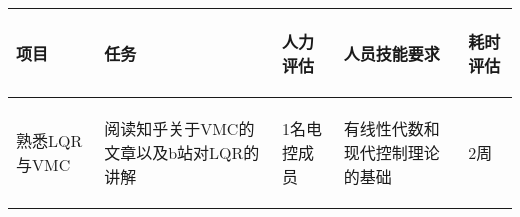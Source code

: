 
\begin{longtable}{ p{2cm} | p{3cm} | p{3cm} | p{4.8cm} | p{2cm} |}

    \hline

    \endfoot
    
    \rowcolor{tabhdcolor}

        \begin{center}
            项目
        \end{center}  &
        \begin{center}
            任务
        \end{center}  &
        \begin{center}
           人力评估
        \end{center} &
        \begin{center}
            人员技能要求
        \end{center}  &
        \begin{center}
            耗时评估
        \end{center}  \\ 
        
    \hline

    \endhead

        \begin{center}
            熟悉LQR与VMC
        \end{center} &
        \begin{center}
            阅读知乎关于VMC的文章以及b站对LQR的讲解
        \end{center} &
        \begin{center}
            1名电控成员
        \end{center} &
        \begin{center}
            有线性代数和现代控制理论的基础
        \end{center} &
        \begin{center}
            2周
        \end{center}\\
        

\end{longtable}

